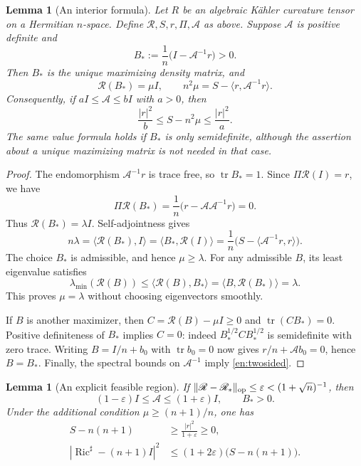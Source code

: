 \documentclass[12pt]{amsart}
\newtheorem{lem}[thm]{Lemma}
\theoremstyle{definition}
\theoremstyle{remark}
\numberwithin{equation}{section}
\DeclareMathOperator{\Ric}{Ric}
\DeclareMathOperator{\tr}{tr}
\theoremstyle{plain}
\theoremstyle{remark}
\theoremstyle{definition}
\begin{document}
\begin{lem}[An interior formula]\label{en:formula}
Let $R$ be an algebraic K\"ahler curvature tensor on a Hermitian
$n$-space. Define $\mathscr R,S,r,\Pi,\mathcal A$ as above. Suppose
$\mathcal A$ is positive definite and
\begin{equation}\label{en:feasible}
 B_*:=\frac1n\bigl(I-\mathcal A^{-1}r\bigr)>0.
\end{equation}
Then $B_*$ is the unique maximizing density matrix, and
\begin{equation}\label{en:formulaeq}
 \mathscr R(B_*)=\mu I,\qquad
 n^2\mu=S-\langle r,\mathcal A^{-1}r\rangle.
\end{equation}
Consequently, if $aI\leq\mathcal A\leq bI$ with $a>0$, then
\begin{equation}\label{en:twosided}
 \frac{|r|^2}{b}\leq S-n^2\mu\leq\frac{|r|^2}{a}.
\end{equation}
The same value formula holds if $B_*$ is only semidefinite, although the
assertion about a unique maximizing matrix is not needed in that case.
\end{lem}

\begin{proof}
The endomorphism $\mathcal A^{-1}r$ is trace free, so $\tr B_*=1$.
Since $\Pi\mathscr R(I)=r$, we have
\[
 \Pi\mathscr R(B_*)=\frac1n\bigl(r-\mathcal A\mathcal A^{-1}r\bigr)=0.
\]
Thus $\mathscr R(B_*)=\lambda I$. Self-adjointness gives
\[
 n\lambda=\langle\mathscr R(B_*),I\rangle
 =\langle B_*,\mathscr R(I)\rangle
 =\frac1n\bigl(S-\langle\mathcal A^{-1}r,r\rangle\bigr).
\]
The choice $B_*$ is admissible, and hence $\mu\geq\lambda$.
For any admissible $B$, its least eigenvalue satisfies
\[
 \lambda_{\min}(\mathscr R(B))
 \leq\langle\mathscr R(B),B_*\rangle
 =\langle B,\mathscr R(B_*)\rangle=\lambda.
\]
This proves $\mu=\lambda$ without choosing eigenvectors smoothly.

If $B$ is another maximizer, then $C=\mathscr R(B)-\mu I\geq0$ and
$\tr(CB_*)=0$. Positive definiteness of $B_*$ implies $C=0$:
indeed $B_*^{1/2}CB_*^{1/2}$ is semidefinite with zero trace.
Writing $B=I/n+b_0$ with $\tr b_0=0$ now gives
$r/n+\mathcal A b_0=0$, hence $B=B_*$. Finally, the spectral bounds on
$\mathcal A^{-1}$ imply \eqref{en:twosided}.
\end{proof}

\begin{lem}[An explicit feasible region]\label{en:pinch}
If $\|\mathscr R-\mathscr R_*\|_{\rm op}\leq\varepsilon<
(1+\sqrt n)^{-1}$, then
\[
 (1-\varepsilon)I\leq\mathcal A\leq(1+\varepsilon)I,
 \qquad B_*>0.
\]
Under the additional condition $\mu\geq(n+1)/n$, one has
\begin{align}
 S-n(n+1)&\geq\frac{|r|^2}{1+\varepsilon}\geq0,\label{en:scalar}\\
 |\Ric^\sharp-(n+1)I|^2
 &\leq(1+2\varepsilon)\bigl(S-n(n+1)\bigr).\label{en:pointwiseE}
\end{align}
\end{lem}
\end{document}
